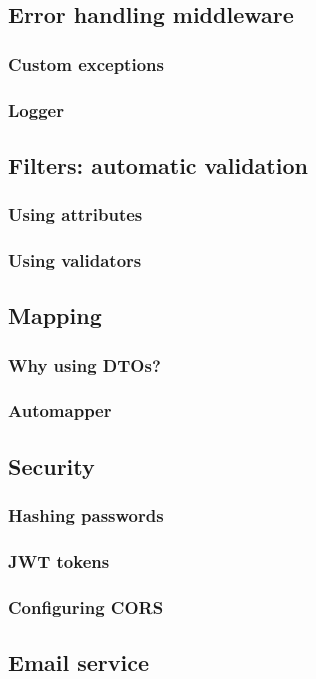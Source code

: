     \subsection{Error handling middleware}
        \subsubsection{Custom exceptions}
        \subsubsection{Logger}
    \subsection{Filters: automatic validation}
        \subsubsection{Using attributes}
        \subsubsection{Using validators}
    \subsection{Mapping}
        \subsubsection{Why using DTOs?}
        \subsubsection{Automapper}
    \subsection{Security}
        \subsubsection{Hashing passwords}
        \subsubsection{JWT tokens}
        \subsubsection{Configuring CORS}
    \subsection{Email service}
